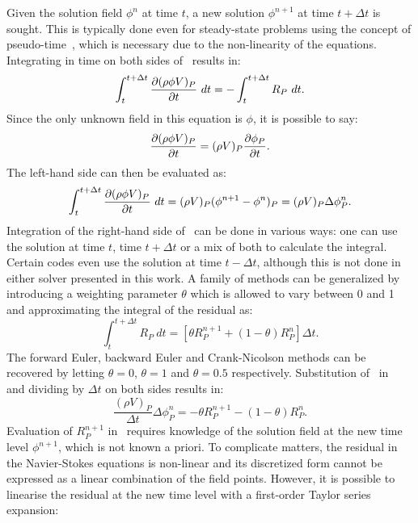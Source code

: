 Given the solution field $\phi^n$ at time $t$, a new solution $\phi^{n+1}$ at time $t + \Delta t$ is sought. This is typically done even for steady-state problems using the concept of pseudo-time~\cite{blazek2015computational}, which is necessary due to the non-linearity of the equations. Integrating in time on both sides of~ results in:
\begin{equation}
    \int_t^{t+\Delta t} 
         \frac{\partial (\rho \phi V)_P}{\partial t} 
   ~dt
    = -\int_t^{t+\Delta t} R_P~dt
    \label{eq:time2}.
\end{equation}
Since the only unknown field in this equation is $\phi$, it is possible to say:
\begin{equation*}
     \frac{\partial (\rho \phi V)_P}{\partial t}  = (\rho V)_P  \frac{\partial \phi_P}{\partial t} .
\end{equation*}
The left-hand side  can then be evaluated as:
\begin{equation}
    \int_t^{t+\Delta t} 
         \frac{\partial (\rho \phi V)_P}{\partial t} 
   ~dt = 
   (\rho V)_P (\phi^{n+1} - \phi^n)_P
   = (\rho V)_P \Delta \phi_P^n
   \label{eq:timediff}.
\end{equation}
Integration of the right-hand side of~ can be done in various ways: one can use the solution at time $t$, time $t + \Delta t$ or a mix of both to calculate the integral. Certain codes even use the solution at time $t - \Delta t$, although this is not done in either solver presented in this work.  A family of methods can be generalized by introducing a weighting parameter $\theta$ which is allowed to vary between 0 and 1 and approximating the integral of the residual as:
\begin{equation}
    \int_t^{t+\Delta t} R_P~dt = \left[ 
        \theta R_P^{n+1} + (1 - \theta) R_P^n
    \right] \Delta t
    \label{eq:timeint}.
\end{equation}
The forward Euler, backward Euler and Crank-Nicolson methods can be recovered by letting $\theta = 0$, $\theta = 1$ and $\theta = 0.5$ respectively. Substitution of~ in~ and dividing by $\Delta t$ on both sides results in:
\begin{equation}
    \frac{(\rho V)_P}{\Delta t}\Delta \phi_P^n = -\theta R_P^{n+1} - (1 - \theta) R_P^n
    \label{eq:timeimp}.
\end{equation}
Evaluation of $R_P^{n+1}$ in~ requires knowledge of the solution field at the new time level $\phi^{n+1}$, which is not known a priori. To complicate matters, the residual in the Navier-Stokes equations is non-linear and its discretized form cannot be expressed as a linear combination of the field points. However, it is possible to linearise the residual at the new time level with a first-order Taylor series expansion:
